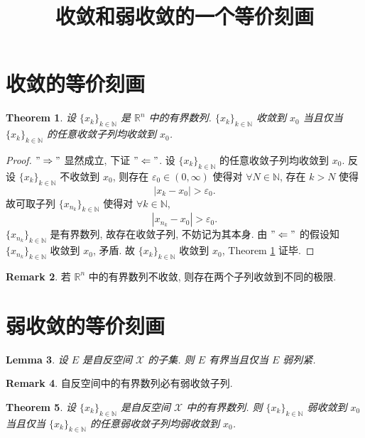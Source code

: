 \documentclass[a4paper,11pt]{article}
\title{收敛和弱收敛的一个等价刻画}
\newtheorem{theorem}{Theorem}[section]
\newtheorem{lemma}[theorem]{Lemma}
\theoremstyle{definition}
\newtheorem{remark}[theorem]{Remark}
\begin{document}
\maketitle

\section{收敛的等价刻画}

\begin{theorem} \label{thm1}
    设 $ \{x_k\}_{k \in \mathbb{N}} $ 是 $ \mathbb{R}^n $ 中的有界数列.
    $ \{x_k\}_{k \in \mathbb{N}} $ 收敛到 $ x_0 $ 当且仅当 
    $ \{x_k\}_{k \in \mathbb{N}} $ 的任意收敛子列均收敛到 $ x_0 $.
\end{theorem}

\begin{proof}
    $ "\Rightarrow" $ 显然成立, 下证 $ "\Leftarrow" $. 
    设 $ \{x_k\}_{k \in \mathbb{N}} $ 的任意收敛子列均收敛到 $ x_0 $.
    反设 $ \{x_k\}_{k \in \mathbb{N}} $ 不收敛到 $ x_0 $, 
    则存在 $ \varepsilon_0 \in (0, \infty) $ 使得对 $ \forall N \in \mathbb{N} $, 存在 $ k > N $ 使得
    $$
        |x_k - x_0| > \varepsilon_0.
    $$
    故可取子列 $ \{x_{n_k}\}_{k \in \mathbb{N}} $ 使得对 $ \forall k \in \mathbb{N} $,
    $$
        |x_{n_k} - x_0| > \varepsilon_0.
    $$
    $ \{x_{n_k}\}_{k \in \mathbb{N}} $ 是有界数列, 故存在收敛子列, 不妨记为其本身.
    由 $ "\Leftarrow" $ 的假设知 $ \{x_{n_k}\}_{k \in \mathbb{N}} $ 收敛到 $ x_0 $, 矛盾.
    故 $ \{x_k\}_{k \in \mathbb{N}} $ 收敛到 $ x_0 $, Theorem \ref{thm1} 证毕.
\end{proof}

\begin{remark} \label{2}
    若 $ \mathbb{R}^n $ 中的有界数列不收敛, 则存在两个子列收敛到不同的极限.
\end{remark}

\section{弱收敛的等价刻画}

\begin{lemma} 
    设 $ E $ 是自反空间 $ \mathcal{X} $ 的子集. 则 $ E $ 有界当且仅当 $ E $ 弱列紧.
\end{lemma}

\begin{remark} \label{lem}
    自反空间中的有界数列必有弱收敛子列. 
\end{remark}

\begin{theorem} \label{thm2}
    设 $ \{x_k\}_{k \in \mathbb{N}} $ 是自反空间 $ \mathcal{X} $ 中的有界数列. 则
    $ \{x_k\}_{k \in \mathbb{N}} $ 弱收敛到 $ x_0 $ 当且仅当 
    $ \{x_k\}_{k \in \mathbb{N}} $ 的任意弱收敛子列均弱收敛到 $ x_0 $.
\end{theorem}
\end{document}
